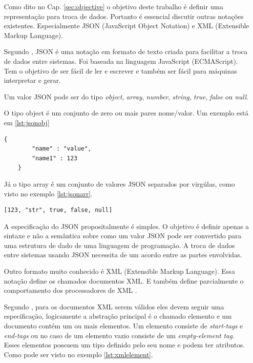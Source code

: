Como dito no Cap. \ref{sec:objective} o objetivo deste trabalho é definir
uma representação para troca de dados. Portanto é essencial discutir outras
notações existentes. Especialmente JSON (JavaScript Object Notation) e 
XML (Extensible Markup Language).

Segundo , JSON é uma notação em formato de texto criada para facilitar 
a troca de dados entre sistemas. Foi baseada na linguagem JavaScript (ECMAScript). 
Tem o objetivo de ser fácil de ler e escrever e também ser fácil para máquinas interpretar e gerar.

Um valor JSON pode ser do tipo \textit{object}, \textit{array}, \textit{number}, \textit{string}, 
\textit{true}, \textit{false} ou \textit{null}. 

O tipo object é um conjunto de zero ou mais pares nome/valor. Um exemplo está em \ref{lst:jsonobj}

\begin{lstlisting}[caption=Exemplo de JSON Object,label={lst:jsonobj}]
    {
        "name" : "value",
        "name1" : 123
    }
\end{lstlisting}

Já o tipo array é um conjunto de valores JSON separados por virgúlas, como visto no exemplo \ref{lst:jsonarr}.

\begin{lstlisting}[caption=Exemplo de JSON Array,label={lst:jsonarr}]
    [123, "str", true, false, null]
\end{lstlisting}

A especificação do JSON propositalmente é simples. O objetivo é definir apenas a sintaxe e não a semântica
sobre como um valor JSON pode ser convertido para uma estrutura de dado de uma linguagem de programação.
A troca de dados entre sistemas usando JSON necessita de um acordo entre as partes envolvidas.

Outro formato muito conhecido é XML (Extensible Markup Language). Essa notação define os chamados documentos XML.
E também define parcialmente o comportamento dos processadores de XML \cite{XML}. 

Segundo , para os documentos XML serem válidos eles devem seguir uma especificação, 
logicamente a abstração principal é o chamado elemento e um documento contém um ou mais elementos. 
Um elemento consiste de \textit{start-tags} e \textit{end-tags} ou no caso de um elemento vazio 
consiste de um \textit{empty-element tag}. Esses elementos possuem um tipo definido pelo seu nome e 
podem ter atributos. Como pode ser visto no exemplo \ref{lst:xmlelement}.


